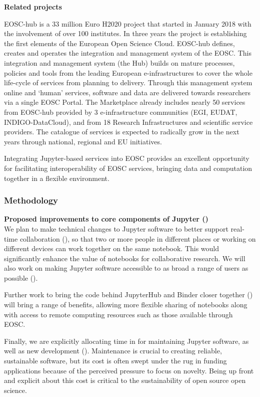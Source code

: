 \medskip
\noindent\textbf{Related projects}

EOSC-hub is a 33 million Euro H2020 project that started in January 2018 with
the involvement of over 100 institutes. In three years the project is
establishing the first elements of the European Open Science Cloud. EOSC-hub
defines, creates and operates the integration and management system of the
EOSC.  This integration and management system (the Hub) builds on mature
processes, policies and tools from the leading European e-infrastructures to
cover the whole life-cycle of services from planning to delivery. Through this
management system online and `human' services, software and data are delivered
towards researchers via a single EOSC Portal. The Marketplace already includes
nearly 50 services from EOSC-hub provided by 3 e-infrastructure communities
(EGI, EUDAT, INDIGO-DataCloud), and from 18 Research Infrastructures and
scientific service providers. The catalogue of services is expected to
radically grow in the next years through national, regional and EU
initiatives.

Integrating Jupyter-based services into EOSC provides an excellent opportunity
for facilitating interoperability of EOSC services,
bringing data and computation together in a flexible environment.

\subsubsection{Methodology}\label{sec:methodology}


\textbf{Proposed improvements to core components of Jupyter ()}\\
We plan to make technical changes to Jupyter software to better support
real-time collaboration (),
so that two or more people in different places or working on different
devices can work together
on the same notebook. This would significantly enhance the value of
notebooks for collaborative research.
We will also work on making Jupyter software accessible to as broad a
range of users as possible ().

Further work to bring the code behind JupyterHub and Binder closer together
() will bring a range of benefits, allowing more
flexible sharing of notebooks along with access to remote computing resources
such as those available through EOSC.

Finally, we are explicitly allocating time in  for maintaining
Jupyter software, as well as new development ().
Maintenance is crucial to creating reliable, sustainable software,
but its cost is often swept under the rug in funding applications
because of the perceived pressure to focus on novelty.
Being up front and explicit about this cost is critical to the sustainability
of open source open science.

